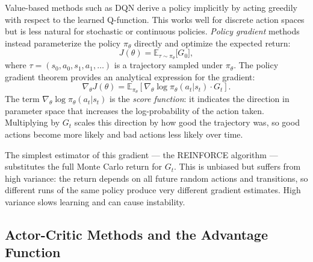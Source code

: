 Value-based methods such as DQN derive a policy implicitly by acting greedily with respect to the learned Q-function. This works well for discrete action spaces but is less natural for stochastic or continuous policies. \emph{Policy gradient} methods instead parameterize the policy $\pi_\theta$ directly and optimize the expected return:
\begin{equation}
  J(\theta) = \mathbb{E}_{\tau \sim \pi_\theta}\bigl[G_0\bigr],
\end{equation}
where $\tau = (s_0, a_0, s_1, a_1, \ldots)$ is a trajectory sampled under $\pi_\theta$. The policy gradient theorem \citep{sutton2018reinforcement} provides an analytical expression for the gradient:
\begin{equation}
  \nabla_\theta J(\theta) = \mathbb{E}_{\pi_\theta}\!\left[\nabla_\theta \log \pi_\theta(a_t|s_t)\cdot G_t\right].
  \label{eq:policy_gradient}
\end{equation}
The term $\nabla_\theta \log \pi_\theta(a_t|s_t)$ is the \emph{score function}: it indicates the direction in parameter space that increases the log-probability of the action taken. Multiplying by $G_t$ scales this direction by how good the trajectory was, so good actions become more likely and bad actions less likely over time.

The simplest estimator of this gradient — the REINFORCE algorithm \citep{williams1992simple} — substitutes the full Monte Carlo return for $G_t$. This is unbiased but suffers from high variance: the return depends on all future random actions and transitions, so different runs of the same policy produce very different gradient estimates. High variance slows learning and can cause instability.

\subsection{Actor-Critic Methods and the Advantage Function}
\label{sec:TheoreticalBackground_A2C}

